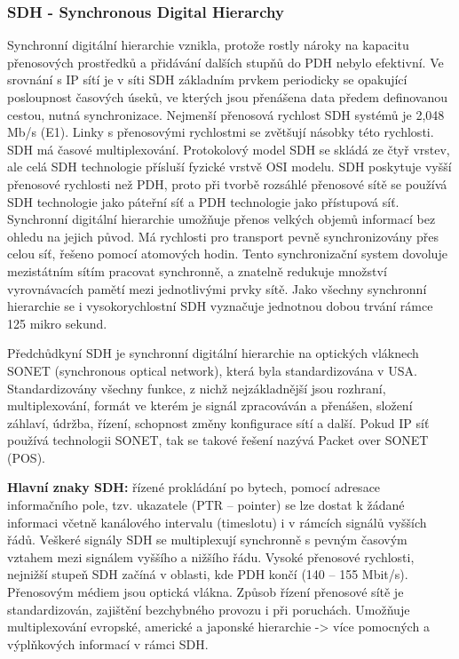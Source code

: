 \subsubsection{SDH - Synchronous Digital Hierarchy}
Synchronní digitální hierarchie vznikla, protože rostly nároky na kapacitu přenosových prostředků a přidávání dalších stupňů do PDH nebylo efektivní. Ve srovnání s IP sítí je v síti SDH základním prvkem periodicky se opakující posloupnost časových úseků, ve kterých jsou přenášena data předem definovanou cestou, nutná synchronizace. 
Nejmenší přenosová rychlost SDH systémů je 2,048 Mb/s (E1). Linky s přenosovými rychlostmi se zvětšují násobky této rychlosti. SDH má časové multiplexování.
Protokolový model SDH se skládá ze čtyř vrstev, ale celá SDH technologie přísluší fyzické vrstvě OSI modelu. SDH poskytuje vyšší přenosové rychlosti než PDH, proto při tvorbě rozsáhlé přenosové sítě se používá SDH technologie jako páteřní síť a PDH technologie jako přístupová síť. Synchronní digitální hierarchie umožňuje přenos velkých objemů informací bez ohledu na jejich původ. Má rychlosti pro transport pevně synchronizovány přes celou síť, řešeno pomocí atomových hodin. Tento synchronizační system dovoluje mezistátním sítím pracovat synchronně, a znatelně redukuje množství vyrovnávacích pamětí mezi jednotlivými prvky sítě. Jako všechny synchronní hierarchie se i vysokorychlostní SDH vyznačuje jednotnou dobou trvání rámce 125 mikro sekund.

Předchůdkyní SDH je synchronní digitální hierarchie na optických vláknech SONET (synchronous optical network), která byla standardizována v USA. Standardizovány všechny funkce, z nichž nejzákladnější jsou rozhraní, multiplexování, formát ve kterém je signál zpracováván a přenášen, složení záhlaví, údržba, řízení, schopnost změny konfigurace sítí a další. Pokud IP síť používá technologii SONET, tak se takové řešení nazývá Packet over SONET (POS).

\textbf{Hlavní znaky SDH:} řízené prokládání po bytech, pomocí adresace informačního pole, tzv. ukazatele (PTR – pointer) se lze dostat k žádané informaci včetně kanálového intervalu (timeslotu) i v rámcích signálů vyšších řádů. Veškeré signály SDH se multiplexují synchronně s pevným časovým vztahem mezi signálem vyššího a nižšího řádu. Vysoké přenosové rychlosti, nejnižší stupeň SDH začíná v oblasti, kde PDH končí (140 – 155 Mbit/s). Přenosovým médiem jsou optická vlákna. Způsob řízení přenosové sítě je standardizován, zajištění bezchybného provozu i při poruchách. Umožňuje multiplexování evropské, americké a japonské hierarchie -> více pomocných a výplňkových informací v rámci SDH.

